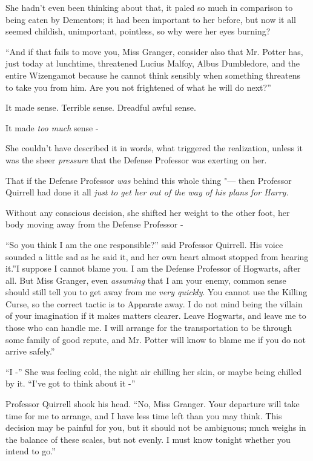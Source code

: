 She hadn't even been thinking about that, it paled so much in comparison
to being eaten by Dementors; it had been important to her before, but
now it all seemed childish, unimportant, pointless, so why were her eyes
burning?

``And if that fails to move you, Miss Granger, consider also that Mr.
Potter has, just today at lunchtime, threatened Lucius Malfoy, Albus
Dumbledore, and the entire Wizengamot because he cannot think sensibly
when something threatens to take you from him. Are you not frightened of
what he will do next?''

It made sense. Terrible sense. Dreadful awful sense.

It made \emph{too much} sense -

She couldn't have described it in words, what triggered the realization,
unless it was the sheer \emph{pressure} that the Defense Professor was
exerting on her.

That if the Defense Professor \emph{was} behind this whole thing "--- then
Professor Quirrell had done it all \emph{just to get her out of the way
of his plans for Harry.}

Without any conscious decision, she shifted her weight to the other
foot, her body moving away from the Defense Professor -

``So you think I am the one responsible?'' said Professor Quirrell. His
voice sounded a little sad as he said it, and her own heart almost
stopped from hearing it.''I suppose I cannot blame you. I am the Defense
Professor of Hogwarts, after all. But Miss Granger, even \emph{assuming}
that I am your enemy, common sense should still tell you to get away
from me \emph{very quickly}. You cannot use the Killing Curse, so the
correct tactic is to Apparate away. I do not mind being the villain of
your imagination if it makes matters clearer. Leave Hogwarts, and leave
me to those who can handle me. I will arrange for the transportation to
be through some family of good repute, and Mr. Potter will know to blame
me if you do not arrive safely.''

``I -'' She was feeling cold, the night air chilling her skin, or maybe
being chilled by it. ``I've got to think about it -''

Professor Quirrell shook his head. ``No, Miss Granger. Your departure
will take time for me to arrange, and I have less time left than you may
think. This decision may be painful for you, but it should not be
ambiguous; much weighs in the balance of these scales, but not evenly. I
must know tonight whether you intend to go.''

